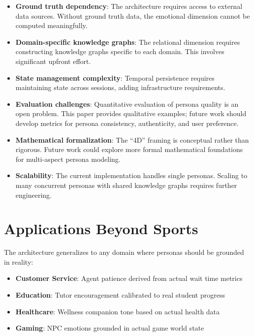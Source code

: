 \documentclass[11pt]{article}
\begin{document}
\begin{itemize}
    \item \textbf{Ground truth dependency}: The architecture requires access to external data sources. Without ground truth data, the emotional dimension cannot be computed meaningfully.

    \item \textbf{Domain-specific knowledge graphs}: The relational dimension requires constructing knowledge graphs specific to each domain. This involves significant upfront effort.

    \item \textbf{State management complexity}: Temporal persistence requires maintaining state across sessions, adding infrastructure requirements.

    \item \textbf{Evaluation challenges}: Quantitative evaluation of persona quality is an open problem. This paper provides qualitative examples; future work should develop metrics for persona consistency, authenticity, and user preference.

    \item \textbf{Mathematical formalization}: The ``4D'' framing is conceptual rather than rigorous. Future work could explore more formal mathematical foundations for multi-aspect persona modeling.

    \item \textbf{Scalability}: The current implementation handles single personas. Scaling to many concurrent personas with shared knowledge graphs requires further engineering.
\end{itemize}

\section{Applications Beyond Sports}

The architecture generalizes to any domain where personas should be grounded in reality:

\begin{itemize}
    \item \textbf{Customer Service}: Agent patience derived from actual wait time metrics
    \item \textbf{Education}: Tutor encouragement calibrated to real student progress
    \item \textbf{Healthcare}: Wellness companion tone based on actual health data
    \item \textbf{Gaming}: NPC emotions grounded in actual game world state
\end{itemize}
\end{document}

